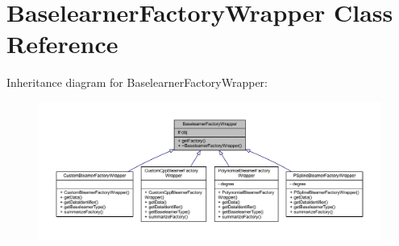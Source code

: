 \hypertarget{class_baselearner_factory_wrapper}{}\section{Baselearner\+Factory\+Wrapper Class Reference}
\label{class_baselearner_factory_wrapper}


Inheritance diagram for Baselearner\+Factory\+Wrapper\+:
\nopagebreak
\begin{figure}[H]
\begin{center}
\leavevmode
\includegraphics[width=350pt]{class_baselearner_factory_wrapper__inherit__graph}
\end{center}
\end{figure}


